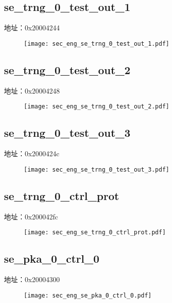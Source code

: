 \subsection{se\_trng\_0\_test\_out\_1}
\label{sec_eng-se-trng-0-test-out-1}
地址：0x20004244
 \begin{figure}[H]
\texttt{[image: sec\_eng\_se\_trng\_0\_test\_out\_1.pdf]}
\end{figure}

\subsection{se\_trng\_0\_test\_out\_2}
\label{sec_eng-se-trng-0-test-out-2}
地址：0x20004248
 \begin{figure}[H]
\texttt{[image: sec\_eng\_se\_trng\_0\_test\_out\_2.pdf]}
\end{figure}

\subsection{se\_trng\_0\_test\_out\_3}
\label{sec_eng-se-trng-0-test-out-3}
地址：0x2000424c
 \begin{figure}[H]
\texttt{[image: sec\_eng\_se\_trng\_0\_test\_out\_3.pdf]}
\end{figure}

\subsection{se\_trng\_0\_ctrl\_prot}
\label{sec_eng-se-trng-0-ctrl-prot}
地址：0x200042fc
 \begin{figure}[H]
\texttt{[image: sec\_eng\_se\_trng\_0\_ctrl\_prot.pdf]}
\end{figure}

\subsection{se\_pka\_0\_ctrl\_0}
\label{sec_eng-se-pka-0-ctrl-0}
地址：0x20004300
 \begin{figure}[H]
\texttt{[image: sec\_eng\_se\_pka\_0\_ctrl\_0.pdf]}
\end{figure}

